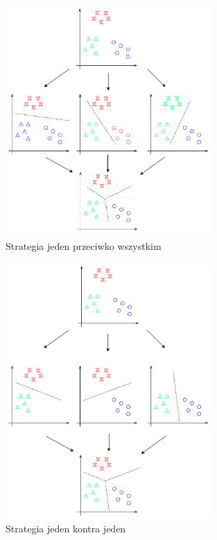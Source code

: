 \begin{figure}[]
    \centering
    \includegraphics[width=0.7\textwidth]{images/ovr}
    \caption{ Strategia jeden przeciwko wszystkim }
    \customsource
    \label{fig:ovr}
\end{figure}

\begin{figure}[]
    \centering
    \includegraphics[width=0.7\textwidth]{images/ovo}
    \caption{ Strategia jeden kontra jeden }
    \customsource
    \label{fig:ovo}
\end{figure}



